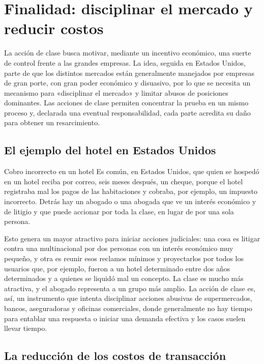 \documentclass[12pt,oneside]{book}
\begin{document}
\section{Finalidad: disciplinar el mercado y reducir costos}

La acción de clase busca motivar, mediante un incentivo económico, una suerte de control frente a las grandes empresas. La idea, seguida en Estados Unidos, parte de que los distintos mercados están generalmente manejados por empresas de gran porte, con gran poder económico y disuasivo, por lo que se necesita un mecanismo para «disciplinar el mercado» y limitar abusos de posiciones dominantes. Las acciones de clase permiten concentrar la prueba en un mismo proceso y, declarada una eventual responsabilidad, cada parte acredita su daño para obtener un resarcimiento.

\subsection{El ejemplo del hotel en Estados Unidos}

\begin{example}{Cobro incorrecto en un hotel}
Es común, en Estados Unidos, que quien se hospedó en un hotel reciba por correo, seis meses después, un cheque, porque el hotel registraba mal los pagos de las habitaciones y cobraba, por ejemplo, un impuesto incorrecto. Detrás hay un abogado o una abogada que ve un interés económico y de litigio y que puede accionar por toda la clase, en lugar de por una sola persona.
\end{example}

Esto genera un mayor atractivo para iniciar acciones judiciales: una cosa es litigar contra una multinacional por dos personas con un interés económico muy pequeño, y otra es reunir esos reclamos mínimos y proyectarlos por todos los usuarios que, por ejemplo, fueron a un hotel determinado entre dos años determinados y a quienes se liquidó mal un concepto. La clase es mucho más atractiva, y el abogado representa a un grupo más amplio. La acción de clase es, así, un instrumento que intenta disciplinar acciones abusivas de supermercados, bancos, aseguradoras y oficinas comerciales, donde generalmente no hay tiempo para entablar una respuesta o iniciar una demanda efectiva y los casos suelen llevar tiempo.

\subsection{La reducción de los costos de transacción}
\end{document}
